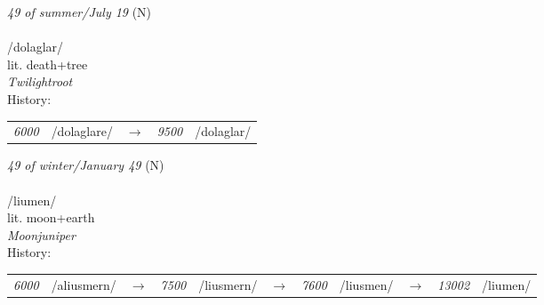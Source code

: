 \vspace{15pt}
\begin{nopagebreak}
 \textit{49 of summer/July 19} (N)\\
\\
\noindent /dol{\textprimstress}aglar/\\
\noindent lit. death+tree\\
\noindent \textit{Twilightroot}\\


\noindent History:

\vspace{-0pt}
\hspace{40pt}
\begin{tabular}{ccc}
\textit{6000} & /dolaglare/&$\rightarrow$ & \textit{9500} & /dolaglar/& \\
\end{tabular}

\vspace{20pt}\hline

\end{nopagebreak}
\filbreak



\vspace{15pt}
\begin{nopagebreak}
 \textit{49 of winter/January 49} (N)\\
\\
\noindent /li{\textprimstress}umen/\\
\noindent lit. moon+earth\\
\noindent \textit{Moonjuniper}\\


\noindent History:

\vspace{-0pt}
\hspace{40pt}
\begin{tabular}{ccc}
\textit{6000} & /aliusmern/&$\rightarrow$ & \textit{7500} & /liusmern/&$\rightarrow$ & \textit{7600} & /liusmen/&$\rightarrow$ & \textit{13002} & /liumen/& \\
\end{tabular}

\vspace{20pt}\hline

\end{nopagebreak}
\filbreak



